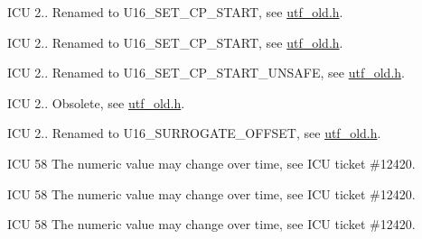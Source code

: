 \begin{DoxyRefList}
%
I\+CU 2.. Renamed to U16\+\_\+\+S\+E\+T\+\_\+\+C\+P\+\_\+\+S\+T\+A\+RT, see \mbox{\hyperlink{utf__old_8h}{utf\+\_\+old.\+h}}.  
\item[Member \mbox{\hyperlink{utf__old_8h_aedf01b69e72b1711b468ff8e526fa0a0}{U\+T\+F\+\_\+\+S\+E\+T\+\_\+\+C\+H\+A\+R\+\_\+\+S\+T\+A\+R\+T\+\_\+\+S\+A\+FE}} (s, start, i)]\label{deprecated__deprecated000203}%
%
I\+CU 2.. Renamed to U16\+\_\+\+S\+E\+T\+\_\+\+C\+P\+\_\+\+S\+T\+A\+RT, see \mbox{\hyperlink{utf__old_8h}{utf\+\_\+old.\+h}}.  
\item[Member \mbox{\hyperlink{utf__old_8h_a95e56600677e8baaaafd19bd90133234}{U\+T\+F\+\_\+\+S\+E\+T\+\_\+\+C\+H\+A\+R\+\_\+\+S\+T\+A\+R\+T\+\_\+\+U\+N\+S\+A\+FE}} (s, i)]\label{deprecated__deprecated000202}%
%
I\+CU 2.. Renamed to U16\+\_\+\+S\+E\+T\+\_\+\+C\+P\+\_\+\+S\+T\+A\+R\+T\+\_\+\+U\+N\+S\+A\+FE, see \mbox{\hyperlink{utf__old_8h}{utf\+\_\+old.\+h}}.  
\item[Member \mbox{\hyperlink{utf__old_8h_a90e6cdcb061e73e19f716c04f4bf6372}{U\+T\+F\+\_\+\+S\+I\+ZE}} ]\label{deprecated__deprecated000086}%
%
I\+CU 2.. Obsolete, see \mbox{\hyperlink{utf__old_8h}{utf\+\_\+old.\+h}}.  
\item[Member \mbox{\hyperlink{utf__old_8h_a89fe5e7bdc37286a1d5c67d15a7cd361}{U\+T\+F\+\_\+\+S\+U\+R\+R\+O\+G\+A\+T\+E\+\_\+\+O\+F\+F\+S\+ET}} ]\label{deprecated__deprecated000130}%
%
I\+CU 2.. Renamed to U16\+\_\+\+S\+U\+R\+R\+O\+G\+A\+T\+E\+\_\+\+O\+F\+F\+S\+ET, see \mbox{\hyperlink{utf__old_8h}{utf\+\_\+old.\+h}}.  
\item[Member \mbox{\hyperlink{utrace_8h_a6076ad13223437bd15a3266791905308a3b0b647c015de2cc2346797232ebc3a9}{U\+T\+R\+A\+C\+E\+\_\+\+C\+O\+L\+L\+A\+T\+I\+O\+N\+\_\+\+L\+I\+M\+IT}} ]\label{deprecated__deprecated000230}%
%
I\+CU 58 The numeric value may change over time, see I\+CU ticket \#12420.  
\item[Member \mbox{\hyperlink{utrace_8h_a6076ad13223437bd15a3266791905308ae5986fb60ce52a8e3928873176406bf5}{U\+T\+R\+A\+C\+E\+\_\+\+C\+O\+N\+V\+E\+R\+S\+I\+O\+N\+\_\+\+L\+I\+M\+IT}} ]\label{deprecated__deprecated000229}%
%
I\+CU 58 The numeric value may change over time, see I\+CU ticket \#12420.  
\item[Member \mbox{\hyperlink{utrace_8h_a6076ad13223437bd15a3266791905308a16b8c7b99796a8346d55b8ba0299b6db}{U\+T\+R\+A\+C\+E\+\_\+\+F\+U\+N\+C\+T\+I\+O\+N\+\_\+\+L\+I\+M\+IT}} ]\label{deprecated__deprecated000228}%
%
I\+CU 58 The numeric value may change over time, see I\+CU ticket \#12420. 
\end{DoxyRefList}